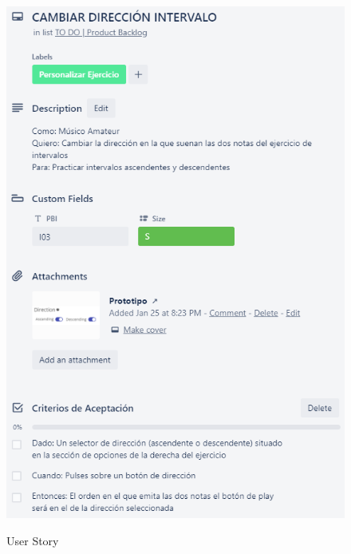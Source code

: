 \documentclass[12pt,twoside,titlepage]{report}
\begin{document}
\begin{figure}[H]
    \centering
    \includegraphics[scale=1.3]{Scrum/User Stories/IntervalosDireccion}
    \label{fig:IntervalosDireccion}
    \caption{User Story}
\end{figure}
\end{document}
